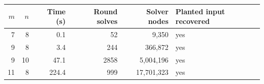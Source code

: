 \begin{tabular}{@{}rrrrrl@{}}
\toprule
$m$ & $n$ & Time (s) & Round solves & Solver nodes & Planted input recovered \\
\midrule
7 & 8 & 0.1 & 52 & 9,350 & yes \\
9 & 8 & 3.4 & 244 & 366,872 & yes \\
9 & 10 & 47.1 & 2858 & 5,004,196 & yes \\
11 & 8 & 224.4 & 999 & 17,701,323 & yes \\
\bottomrule
\end{tabular}

